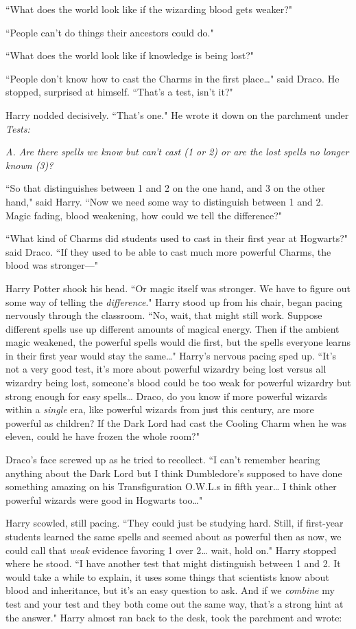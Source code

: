 ``What does the world look like if the wizarding blood gets weaker?"

``People can't do things their ancestors could do."

``What does the world look like if knowledge is being lost?"

``People don't know how to cast the Charms in the first place{\ldots}" said Draco. He stopped, surprised at himself. ``That's a test, isn't it?"

Harry nodded decisively. ``That's one." He wrote it down on the parchment under \emph{Tests:}

\emph{A. Are there spells we know but can't cast (1 or 2) or are the lost spells no longer known (3)?}

``So that distinguishes between 1 and 2 on the one hand, and 3 on the other hand," said Harry. ``Now we need some way to distinguish between 1 and 2. Magic fading, blood weakening, how could we tell the difference?"

``What kind of Charms did students used to cast in their first year at Hogwarts?" said Draco. ``If they used to be able to cast much more powerful Charms, the blood was stronger—"

Harry Potter shook his head. ``Or magic itself was stronger. We have to figure out some way of telling the \emph{difference}." Harry stood up from his chair, began pacing nervously through the classroom. ``No, wait, that might still work. Suppose different spells use up different amounts of magical energy. Then if the ambient magic weakened, the powerful spells would die first, but the spells everyone learns in their first year would stay the same{\ldots}" Harry's nervous pacing sped up. ``It's not a very good test, it's more about powerful wizardry being lost versus all wizardry being lost, someone's blood could be too weak for powerful wizardry but strong enough for easy spells{\ldots} Draco, do you know if more powerful wizards within a \emph{single} era, like powerful wizards from just this century, are more powerful as children? If the Dark Lord had cast the Cooling Charm when he was eleven, could he have frozen the whole room?"

Draco's face screwed up as he tried to recollect. ``I can't remember hearing anything about the Dark Lord but I think Dumbledore's supposed to have done something amazing on his Transfiguration O.W.L.s in fifth year{\ldots} I think other powerful wizards were good in Hogwarts too{\ldots}"

Harry scowled, still pacing. ``They could just be studying hard. Still, if first-year students learned the same spells and seemed about as powerful then as now, we could call that \emph{weak} evidence favoring 1 over 2{\ldots} wait, hold on." Harry stopped where he stood. ``I have another test that might distinguish between 1 and 2. It would take a while to explain, it uses some things that scientists know about blood and inheritance, but it's an easy question to ask. And if we \emph{combine} my test and your test and they both come out the same way, that's a strong hint at the answer." Harry almost ran back to the desk, took the parchment and wrote:

